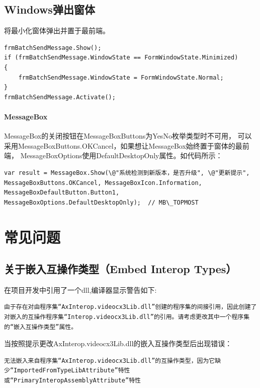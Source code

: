 \documentclass{book}
\begin{document}
\subsection{Windows弹出窗体}

将最小化窗体弹出并置于最前端。

\begin{lstlisting}[language={[Sharp]C}]
frmBatchSendMessage.Show();
if (frmBatchSendMessage.WindowState == FormWindowState.Minimized)
{
	frmBatchSendMessage.WindowState = FormWindowState.Normal;
}
frmBatchSendMessage.Activate();
\end{lstlisting}

\paragraph{MessageBox}MessageBox的关闭按钮在MessageBoxButtons为YesNo枚举类型时不可用，
可以采用MessageBoxButtons.OKCancel，如果想让MessageBox始终置于窗体的最前端，
MessageBoxOptions使用DefaultDesktopOnly属性。如代码所示：

\begin{lstlisting}[language={[Sharp]C}]
var result = MessageBox.Show(\@"系统检测到新版本，是否升级", \@"更新提示", MessageBoxButtons.OKCancel, MessageBoxIcon.Information, MessageBoxDefaultButton.Button1, MessageBoxOptions.DefaultDesktopOnly);  // MB\_TOPMOST
\end{lstlisting}

\section{常见问题}

\subsection{关于嵌入互操作类型（Embed Interop Types）}

在项目开发中引用了一个dll,编译器显示警告如下:

\begin{lstlisting}
由于存在对由程序集“AxInterop.videocx3Lib.dll”创建的程序集的间接引用，因此创建了对嵌入的互操作程序集“Interop.videocx3Lib.dll”的引用。请考虑更改其中一个程序集的“嵌入互操作类型”属性。
\end{lstlisting}

当按照提示更改AxInterop.videocx3Lib.dll的嵌入互操作类型后出现错误：

\begin{lstlisting}
无法嵌入来自程序集“AxInterop.videocx3Lib.dll”的互操作类型，因为它缺少“ImportedFromTypeLibAttribute”特性或“PrimaryInteropAssemblyAttribute”特性
\end{lstlisting}
\end{document}
